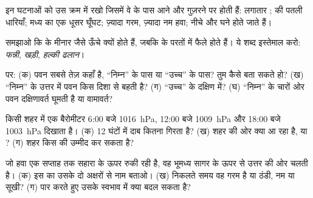 \begin{exercise}[$\star\star$]\label{exo:g8:fronts-and-weather-maps:5}
इन घटनाओं को उस क्रम में रखो जिसमें वे  के पास आने और गुज़रने पर होती हैं:
लगातार ;  की पतली धारियाँ; मध्य  का एक धूसर घूँघट; ज़्यादा
गरम, ज़्यादा नम हवा;  नीचे और घने होते जाते हैं।
\end{exercise}

\begin{exercise}[$\star\star$]\label{exo:g8:fronts-and-weather-maps:6}
समझाओ कि  के  मीनार जैसे ऊँचे क्यों होते हैं, जबकि  के 
परतों में फैले होते हैं। ये शब्द इस्तेमाल करो: \emph{फन्नी}, \emph{खड़ी},
\emph{हल्की ढलान}।
\end{exercise}

\begin{exercise}[$\star\star$]\label{exo:g8:fronts-and-weather-maps:7}
  पर: (क) पवन सबसे तेज़ कहाँ है, ``निम्न'' के पास या ``उच्च'' के पास?
तुम कैसे बता सकते हो? (ख) ``निम्न'' के उत्तर में पवन किस दिशा से बहती है?
(ग) ``उच्च'' के दक्षिण में? (घ) ``निम्न'' के चारों ओर पवन दक्षिणावर्त घूमती है या
वामावर्त?
\end{exercise}

\begin{exercise}[$\star\star$]\label{exo:g8:fronts-and-weather-maps:8}
किसी शहर में एक बैरोमीटर 6:00 बजे \qty{1016}{hPa}, 12:00 बजे \qty{1009}{hPa}
और 18:00 बजे \qty{1003}{hPa} दिखाता है। (क) 12 घंटों में दाब कितना गिरता है?
(ख) शहर की ओर क्या आ रहा है,  या ? (ग) शहर किस  की उम्मीद कर
सकता है?
\end{exercise}

\begin{exercise}[$\star\star$]\label{exo:g8:fronts-and-weather-maps:9}
जो हवा एक सप्ताह तक सहारा के ऊपर रुकी रही है, वह भूमध्य सागर के ऊपर से उत्तर की ओर
चलती है। (क) इस  का उसके दो अक्षरों से नाम बताओ। (ख) निकलते समय वह गरम है
या ठंडी, नम या सूखी? (ग)  पार करते हुए उसके स्वभाव में क्या बदल सकता
है?
\end{exercise}

